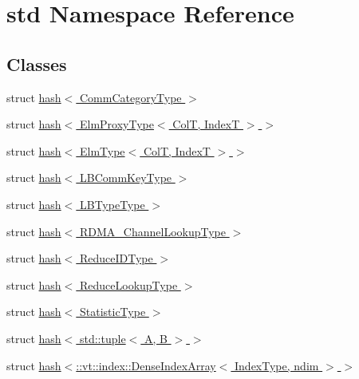\hypertarget{namespacestd}{}\section{std Namespace Reference}
\label{namespacestd}
\subsection*{Classes}
\begin{DoxyCompactItemize}
\item 
struct \hyperlink{structstd_1_1hash_3_01_comm_category_type_01_4}{hash$<$ Comm\+Category\+Type $>$}
\item 
struct \hyperlink{structstd_1_1hash_3_01_elm_proxy_type_3_01_col_t_00_01_index_t_01_4_01_4}{hash$<$ Elm\+Proxy\+Type$<$ Col\+T, Index\+T $>$ $>$}
\item 
struct \hyperlink{structstd_1_1hash_3_01_elm_type_3_01_col_t_00_01_index_t_01_4_01_4}{hash$<$ Elm\+Type$<$ Col\+T, Index\+T $>$ $>$}
\item 
struct \hyperlink{structstd_1_1hash_3_01_l_b_comm_key_type_01_4}{hash$<$ L\+B\+Comm\+Key\+Type $>$}
\item 
struct \hyperlink{structstd_1_1hash_3_01_l_b_type_type_01_4}{hash$<$ L\+B\+Type\+Type $>$}
\item 
struct \hyperlink{structstd_1_1hash_3_01_r_d_m_a___channel_lookup_type_01_4}{hash$<$ R\+D\+M\+A\+\_\+\+Channel\+Lookup\+Type $>$}
\item 
struct \hyperlink{structstd_1_1hash_3_01_reduce_i_d_type_01_4}{hash$<$ Reduce\+I\+D\+Type $>$}
\item 
struct \hyperlink{structstd_1_1hash_3_01_reduce_lookup_type_01_4}{hash$<$ Reduce\+Lookup\+Type $>$}
\item 
struct \hyperlink{structstd_1_1hash_3_01_statistic_type_01_4}{hash$<$ Statistic\+Type $>$}
\item 
struct \hyperlink{structstd_1_1hash_3_01std_1_1tuple_3_01_a_00_01_b_01_4_01_4}{hash$<$ std\+::tuple$<$ A, B $>$ $>$}
\item 
struct \hyperlink{structstd_1_1hash_3_1_1vt_1_1index_1_1_dense_index_array_3_01_index_type_00_01ndim_01_4_01_4}{hash$<$\+::vt\+::index\+::\+Dense\+Index\+Array$<$ Index\+Type, ndim $>$ $>$}
\end{DoxyCompactItemize}
